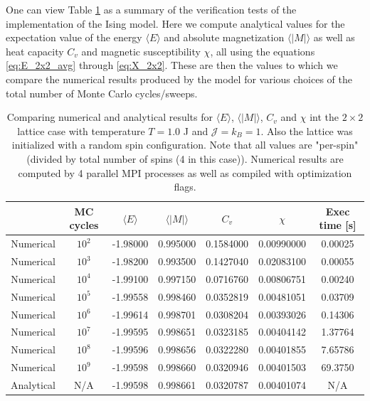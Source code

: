 \documentclass[12pt]{article}
\numberwithin{figure}{section}
\numberwithin{table}{section}
\begin{document}
\noindent One can view Table \ref{tab:2x2_model_verification} as a summary of the verification tests of the implementation of the Ising model. Here we compute analytical values for the expectation value of the energy $\langle E \rangle$ and absolute magnetization $\langle |M| \rangle$ as well as heat capacity $C_v$ and magnetic susceptibility $\chi$, all using the equations \eqref{eq:E_2x2_avg} through \eqref{eq:X_2x2}. These are then the values to which we compare the numerical results produced by the model for various choices of the total number of Monte Carlo cycles/sweeps.

\begin{table}[ht]
\begin{center}
\def\arraystretch{1.5}
  \begin{tabular}{| c | c | c | c | c | c | c |}
  	\hline
  	& MC cycles & $\langle E \rangle$ & $\langle |M| \rangle$ & $C_v$ & $\chi$ & Exec time [s]\\[0.05cm] \hline\hline
  	Numerical & $10^2$ & -1.98000 & 0.995000 & 0.1584000 & 0.00990000 & 0.00025 \\[0.05cm] \hline
  	Numerical & $10^3$ & -1.98200 & 0.993500 & 0.1427040 & 0.02083100 & 0.00055 \\[0.05cm] \hline
  	Numerical & $10^4$ & -1.99100 & 0.997150 & 0.0716760 & 0.00806751 & 0.00240 \\[0.05cm] \hline
  	Numerical & $10^5$ & -1.99558 & 0.998460 & 0.0352819 & 0.00481051 & 0.03709 \\[0.05cm] \hline
  	Numerical & $10^6$ & -1.99614 & 0.998701 & 0.0308204 & 0.00393026 & 0.14306 \\[0.05cm] \hline
  	Numerical & $10^7$ & -1.99595 & 0.998651 & 0.0323185 & 0.00404142 & 1.37764 \\[0.05cm] \hline
  	Numerical & $10^8$ & -1.99596 & 0.998656 & 0.0322280 & 0.00401855 & 7.65786 \\[0.05cm] \hline
  	Numerical & $10^9$ & -1.99598 & 0.998660 & 0.0320946 & 0.00401503 & 69.3750 \\[0.05cm] \hline
  	Analytical & N/A & -1.99598 & 0.998661 & 0.0320787 & 0.00401074 & N/A \\[0.05cm] \hline
  \end{tabular}
\end{center}
\caption{Comparing numerical and analytical results for $\langle E \rangle$, $\langle |M| \rangle$, $C_v$ and $\chi$ int the $2\times2$ lattice case with temperature $T=1.0$ J and $\mathcal{J}=k_B=1$. Also the lattice was initialized with a random spin configuration. Note that all values are "per-spin" (divided by total number of spins (4 in this case)). Numerical results are computed by 4 parallel MPI processes as well as compiled with optimization flags.}
\label{tab:2x2_model_verification}
\end{table}
\end{document}
